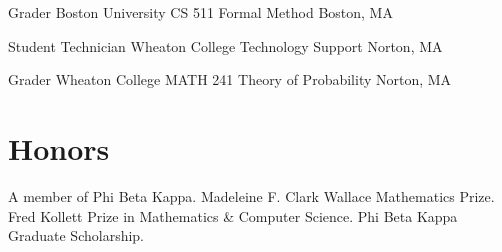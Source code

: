 \documentclass[11pt,a4paper,roman]{moderncv}        %
\begin{document}
{Grader}
{Boston University CS 511 Formal Method}
{Boston, MA}{}{}

{Student Technician}
{Wheaton College Technology Support}
{Norton, MA}{}{}

{Grader}
{Wheaton College MATH 241 Theory of Probability}
{Norton, MA}{}{}



\section{Honors}
 {A member of Phi Beta Kappa.}
 {
  Madeleine F. Clark Wallace Mathematics Prize. \newline
  Fred Kollett Prize in Mathematics \& Computer Science. \newline
  Phi Beta Kappa Graduate Scholarship.
}
\end{document}
